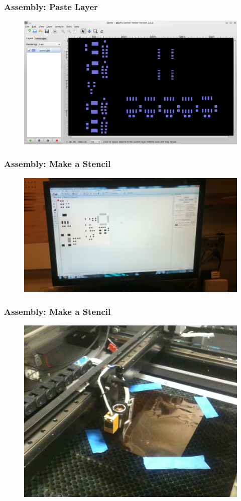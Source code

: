 \documentclass{beamer}
\begin{document}
\begin{frame}
\frametitle{Assembly: Paste Layer}
\begin{figure}
\includegraphics[width=0.9\linewidth]{soldermask-gerb.png}
\end{figure}
\end{frame}


\begin{frame}
\frametitle{Assembly: Make a Stencil}
\begin{figure}
\includegraphics[width=0.9\linewidth]{assemble1.png}
\end{figure}
\end{frame}


\begin{frame}
\frametitle{Assembly: Make a Stencil}
\begin{figure}
\includegraphics[width=0.8\linewidth]{assemble2.png}
\end{figure}
\end{frame}
\end{document}
